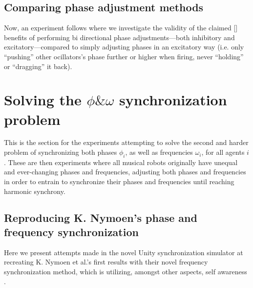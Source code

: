 	
	\subsection{Comparing phase adjustment methods}
	Now, an experiment follows where we investigate the validity of the claimed [] benefits of performing bi directional phase adjustments—both inhibitory and excitatory—compared to simply adjusting phases in an excitatory way (i.e. only ``pushing'' other ocillators's phase further or higher when firing, never ``holding'' or ``dragging'' it back).
	
	
	
	
	
\section{Solving the $\phi \& \omega$ synchronization problem}
This is the section for the experiments attempting to solve the second and harder problem of synchronizing both phases $\phi_i$, as well as frequencies $\omega_i$, for all agents $i$. These are then experiments where all musical robots originally have unequal and ever-changing phases  and frequencies, adjusting both phases and frequencies in order to entrain to synchronize their phases and frequencies until reaching harmonic synchrony.

	\subsection{Reproducing K. Nymoen's phase and frequency synchronization}
	Here we present attempts made in the novel Unity synchronization simulator at recreating K. Nymoen et al.'s first results with their novel frequency synchronization method, which is utilizing, amongst other aspects, self awareness \cite{nymoen_synch}.
	
